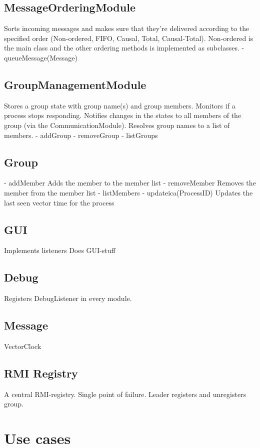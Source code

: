 \documentclass[11pt,swedish]{article}
\begin{document}
\subsection{MessageOrderingModule}
Sorts incoming messages and makes sure that they're delivered according to the specified order (Non-ordered, FIFO, Causal, Total, Causal-Total). Non-ordered is the main class and the other ordering methods is implemented as subclasses. 
- queueMessage(Message)


\subsection{GroupManagementModule}
Stores a group state with group name(s) and group members. Monitors if a process stops responding. Notifies changes in the states to all members of the group (via the CommunicationModule). Resolves group names to a list of members.
- addGroup
- removeGroup
- listGroups

\subsection{Group}
- addMember
	Adds the member to the member list
- removeMember
	Removes the member from the member list
- listMembers
- updateica(ProcessID)
	Updates the last seen vector time for the process

\subsection{GUI}
	Implements listeners
	Does GUI-stuff

\subsection{Debug}
Registers DebugListener in every module.

\subsection{Message}
	VectorClock

\subsection{RMI Registry}
A central RMI-registry. Single point of failure. Leader registers and unregisters group. 

\section{Use cases}
\end{document}
